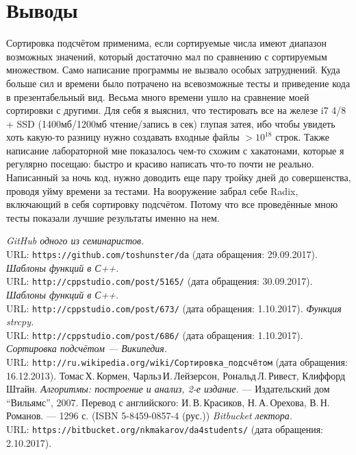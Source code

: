 \documentclass[pdf, unicode, 12pt, a4paper,oneside,fleqn]{article}
\begin{document}
\section{Выводы}

Сортировка подсчётом применима, если сортируемые числа имеют диапазон возможных значений, который достаточно мал по сравнению с сортируемым множеством. Само написание программы не вызвало особых затруднений. Куда больше сил и времени было потрачено на всевозможные тесты и приведение кода в презентабельный вид.\newline
Весьма много времени ушло на сравнение моей сортировки с другими. Для себя я выяснил, что тестировать все на железе i7 4/8 + SSD (1400мб/1200мб чтение/запись в сек) глупая затея, ибо чтобы увидеть хоть какую-то разницу нужно создавать входные файлы $>10^{18}$ строк. Также написание лабораторной мне показалось чем-то схожим с хакатонами, которые я регулярно посещаю: быстро и красиво написать что-то почти не реально. Написанный за ночь код, нужно доводить еще пару тройку дней до совершенства, проводя уйму времени за тестами.
\newline
На вооружение забрал себе Radix, включающий в себя сортировку подсчётом. Потому что все проведённые мною тесты показали лучшие результаты именно на нем.
\pagebreak
\begin{thebibliography}{99}
{\itshape GitHub одного из семинаристов.} \\URL: \texttt{https://github.com/toshunster/da} (дата обращения: 29.09.2017). 
{\itshape Шаблоны функций в С++.} \\URL: \texttt{http://cppstudio.com/post/5165/} (дата обращения: 30.09.2017). 
{\itshape Шаблоны функций в С++.} \\URL: \texttt{http://cppstudio.com/post/673/} (дата обращения: 1.10.2017). 
{\itshape Функция strcpy.} \\URL: \texttt{http://cppstudio.com/post/686/} (дата обращения: 1.10.2017). 
{\itshape Сортировка подсчётом — Википедия.} \\URL: \texttt{http://ru.wikipedia.org/wiki/Сортировка\_подсчётом} (дата обращения: 16.12.2013). 
Томас\,Х.\,Кормен, Чарльз\,И.\,Лейзерсон, Рональд\,Л.\,Ривест, Клиффорд\,Штайн.
{\itshape Алгоритмы: построение и анализ, 2-е издание.} --- Издательский дом \enquote{Вильямс}, 2007. Перевод с английского: И.\,В.\,Красиков, Н.\,А.\,Орехова, В.\,Н.\,Романов. --- 1296 с. (ISBN 5-8459-0857-4 (рус.))
{\itshape Bitbucket лектора.} \\URL: \texttt{https://bitbucket.org/nkmakarov/da4students/} (дата обращения: 2.10.2017). \end{thebibliography}
\end{document}
